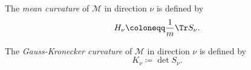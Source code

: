 \begin{definition}\label{def:mean-curvature}
	The \emph{mean curvature} of \(\mathcal{M} \) in direction \(\nu \) is defined by
	\[
		H_\nu \coloneqq \frac{1}{m} \Tr S_\nu .
	\]
\end{definition}

\begin{definition}\label{def:Gauss-Kronecker-curvature}
	The \emph{Gauss-Kronecker curvature} of \(\mathcal{M} \) in direction \(\nu \) is defined by
	\[
		K _\nu \coloneqq \det S_\nu .
	\]
\end{definition}